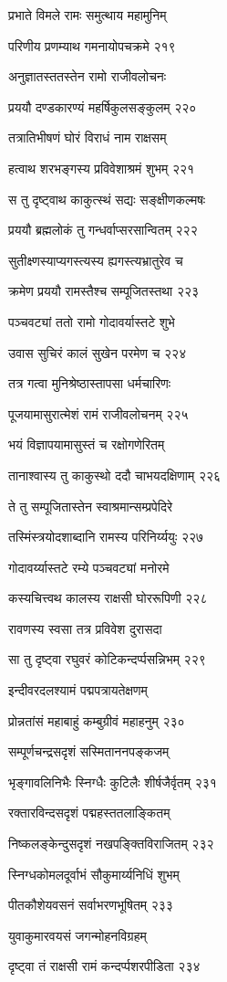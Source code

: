 प्रभाते विमले रामः समुत्थाय महामुनिम्

परिणीय प्रणम्याथ गमनायोपचक्रमे २१९

अनुज्ञातस्ततस्तेन रामो राजीवलोचनः

प्रययौ दण्डकारण्यं महर्षिकुलसङ्कुलम् २२०

तत्रातिभीषणं घोरं विराधं नाम राक्षसम्

हत्वाथ शरभङ्गस्य प्रविवेशाश्रमं शुभम् २२१

स तु दृष्ट्वाथ काकुत्स्थं सद्यः सङ्क्षीणकल्मषः

प्रययौ ब्रह्मलोकं तु गन्धर्वाप्सरसान्वितम् २२२

सुतीक्ष्णस्याप्यगस्त्यस्य ह्यगस्त्यभ्रातुरेव च

क्रमेण प्रययौ रामस्तैश्च सम्पूजितस्तथा २२३

पञ्चवट्यां ततो रामो गोदावर्यास्तटे शुभे

उवास सुचिरं कालं सुखेन परमेण च २२४

तत्र गत्वा मुनिश्रेष्ठास्तापसा धर्मचारिणः

पूजयामासुरात्मेशं रामं राजीवलोचनम् २२५

भयं विज्ञापयामासुस्तं च रक्षोगणेरितम्

तानाश्वास्य तु काकुस्थो ददौ चाभयदक्षिणाम् २२६

ते तु सम्पूजितास्तेन स्वाश्रमान्सम्प्रपेदिरे

तस्मिंस्त्रयोदशाब्दानि रामस्य परिनिर्य्ययुः २२७

गोदावर्य्यास्तटे रम्ये पञ्चवट्यां मनोरमे

कस्यचित्त्वथ कालस्य राक्षसी घोररूपिणी २२८

रावणस्य स्वसा तत्र प्रविवेश दुरासदा

सा तु दृष्ट्वा रघुवरं कोटिकन्दर्प्पसन्निभम् २२९

इन्दीवरदलश्यामं पद्मपत्रायतेक्षणम्

प्रोन्नतांसं महाबाहुं कम्बुग्रीवं महाहनुम् २३०

सम्पूर्णचन्द्रसदृशं सस्मिताननपङ्कजम्

भृङ्गावलिनिभैः स्निग्धैः कुटिलैः शीर्षजैर्वृतम् २३१

रक्तारविन्दसदृशं पद्महस्ततलाङ्कितम्

निष्कलङ्केन्दुसदृशं नखपङ्क्तिविराजितम् २३२

स्निग्धकोमलदूर्वाभं सौकुमार्य्यनिधिं शुभम्

पीतकौशेयवसनं सर्वाभरणभूषितम् २३३

युवाकुमारवयसं जगन्मोहनविग्रहम्

दृष्ट्वा तं राक्षसी रामं कन्दर्प्पशरपीडिता २३४

